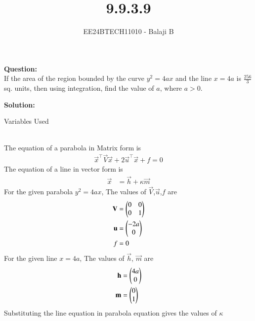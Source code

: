 \documentclass[journal]{IEEEtran}
\begin{document}

\vspace{3cm}

\title{9.9.3.9}
\author{EE24BTECH11010 - Balaji B}
{\let\newpage\relax\maketitle}
\textbf{Question: } \\ 
If the area of the region bounded by the curve $y^2 = 4ax$ and the line $x = 4a$ is $\frac{256}{3}$ sq. units, then using integration, find the value of $a$, where $a > 0$. 

\textbf{Solution:}
\begin{table}[h!]    
  \centering
  
  \caption{Variables Used}
  \label{tab1-1.9-6}
\end{table}\\
The equation of a parabola in Matrix form is
\begin{align}
\vec{x}^\top\vec{V}\vec{x} + 2\vec{u}^\top\vec{x} + f = 0
\end{align}
The equation of a line in vector form is
\begin{align}
\vec{x}&=\vec{h}+\kappa\vec{m}
\end{align}
For the given parabola $y^2=4ax$, The values of $\vec{V}$,$\vec{u}$,$f$ are
\begin{align}
\mathbf{V}&=\begin{pmatrix}0 & 0\\0 & 1\end{pmatrix}\\
\mathbf{u}&=\begin{pmatrix}-2a\\0\end{pmatrix}\\
f&=0
\end{align}
For the given line $x=4a$, The values of $\vec{h}$, $\vec{m}$ are
\begin{align}
\mathbf{h}&=\begin{pmatrix}4a\\0\end{pmatrix}\\
\mathbf{m}&=\begin{pmatrix}0\\1\end{pmatrix}
\end{align}
Substituting the line equation in parabola equation gives the values of $\kappa$
\end{document}
